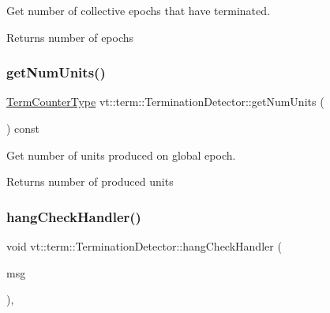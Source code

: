 Get number of collective epochs that have terminated. 

\begin{DoxyReturn}{Returns}
number of epochs 
\end{DoxyReturn}
\mbox{\label{structvt_1_1term_1_1_termination_detector_aa5802cb6f199f3359b1a85058102220c}} 
\subsubsection{\texorpdfstring{get\+Num\+Units()}{getNumUnits()}}
{\footnotesize\ttfamily \hyperlink{namespacevt_1_1term_a4fd378cdb0c36683afc1b3399d685f7f}{Term\+Counter\+Type} vt\+::term\+::\+Termination\+Detector\+::get\+Num\+Units (\begin{DoxyParamCaption}{ }\end{DoxyParamCaption}) const}



Get number of units produced on global epoch. 

\begin{DoxyReturn}{Returns}
number of produced units 
\end{DoxyReturn}
\mbox{\label{structvt_1_1term_1_1_termination_detector_af9fd292c8d1bcc5eba9ee1fb39c29ea2}} 
\subsubsection{\texorpdfstring{hang\+Check\+Handler()}{hangCheckHandler()}}
{\footnotesize\ttfamily void vt\+::term\+::\+Termination\+Detector\+::hang\+Check\+Handler (\begin{DoxyParamCaption}\item[{\hyperlink{structvt_1_1term_1_1_hang_check_msg}{Hang\+Check\+Msg} $\ast$}]{msg }\end{DoxyParamCaption})\hspace{0.3cm}{\ttfamily [static]}, {\ttfamily [private]}}




